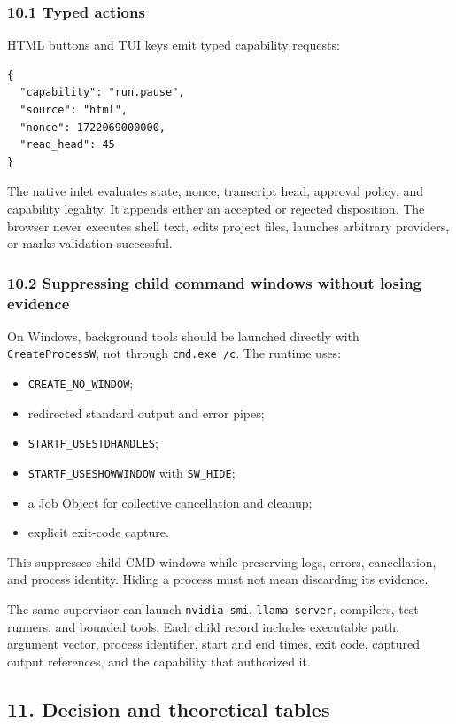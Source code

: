 \subsubsection{10.1 Typed actions}

HTML buttons and TUI keys emit typed capability requests:

\begin{verbatim}
{
  "capability": "run.pause",
  "source": "html",
  "nonce": 1722069000000,
  "read_head": 45
}
\end{verbatim}

The native inlet evaluates state, nonce, transcript head, approval policy, and
capability legality. It appends either an accepted or rejected disposition. The
browser never executes shell text, edits project files, launches arbitrary
providers, or marks validation successful.

\subsubsection{10.2 Suppressing child command windows without losing evidence}

On Windows, background tools should be launched directly with
\texttt{CreateProcessW}, not through \texttt{cmd.exe\ /c}. The runtime uses:

\begin{itemize}
\item
  \texttt{CREATE\_NO\_WINDOW};
\item
  redirected standard output and error pipes;
\item
  \texttt{STARTF\_USESTDHANDLES};
\item
  \texttt{STARTF\_USESHOWWINDOW} with \texttt{SW\_HIDE};
\item
  a Job Object for collective cancellation and cleanup;
\item
  explicit exit-code capture.
\end{itemize}

This suppresses child CMD windows while preserving logs, errors, cancellation,
and process identity. Hiding a process must not mean discarding its evidence.

The same supervisor can launch \texttt{nvidia-smi}, \texttt{llama-server}, compilers, test
runners, and bounded tools. Each child record includes executable path, argument
vector, process identifier, start and end times, exit code, captured output
references, and the capability that authorized it.

\subsection{11. Decision and theoretical tables}

